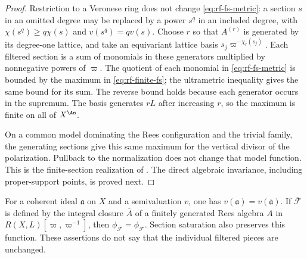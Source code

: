 \begin{proof}
Restriction to a Veronese ring does not change \eqref{eq:rf-fs-metric}: a section $s$ in an omitted degree may be replaced by a power $s^q$ in an included degree, with $\chi(s^q)\geq q\chi(s)$ and $v(s^q)=qv(s)$. Choose $r$ so that $A^{(r)}$ is generated by its degree-one lattice, and take an equivariant lattice basis $s_j\varpi^{-\chi_r(s_j)}$. Each filtered section is a sum of monomials in these generators multiplied by nonnegative powers of $\varpi$. The quotient of each monomial in \eqref{eq:rf-fs-metric} is bounded by the maximum in \eqref{eq:rf-finite-fs}; the ultrametric inequality gives the same bound for its sum. The reverse bound holds because each generator occurs in the supremum. The basis generates $rL$ after increasing $r$, so the maximum is finite on all of $X^{\An}$.

On a common model dominating the Rees configuration and the trivial family, the generating sections give this same maximum for the vertical divisor of the polarization. Pullback to the normalization does not change that model function. This is the finite-section realization of \cite[Theorem~2.31 and Corollary~2.32]{BJ22}. The direct algebraic invariance, including proper-support points, is proved next.
\end{proof}

\noindent\begin{minipage}{\linewidth}
\begin{lemma}\label{lem:rf-integral-closure}
For a coherent ideal $\mathfrak a$ on $X$ and a semivaluation $v$, one has $v(\mathfrak a)=v(\overline{\mathfrak a})$. If $\overline{\mathcal F}$ is defined by the integral closure $\overline A$ of a finitely generated Rees algebra $A$ in $R(X,L)[\varpi,\varpi^{-1}]$, then $\phi_{\overline{\mathcal F}}=\phi_{\mathcal F}$. Section saturation also preserves this function. These assertions do not say that the individual filtered pieces are unchanged.
\end{lemma}
\end{minipage}\par

